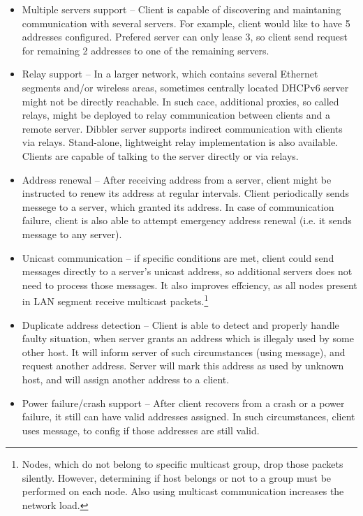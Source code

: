 \begin{itemize}
\item Multiple servers support -- Client is capable of discovering and
  maintaning communication with several servers. For example, client
  would like to have 5 addresses configured. Prefered server can only
  lease 3, so client send request for remaining 2 addresses to one of
  the remaining servers.
\item Relay support -- In a larger network, which contains several
  Ethernet segments and/or wireless areas, sometimes centrally located
  DHCPv6 server might not be directly reachable. In such cace,
  additional proxies, so called relays, might be deployed to relay
  communication between clients and a remote server. Dibbler server
  supports indirect communication with clients via
  relays. Stand-alone, lightweight relay implementation is also
  available. Clients are capable of talking to the server directly or
  via relays.
\item Address renewal -- After receiving address from a server, client
  might be instructed to renew its address at regular
  intervals. Client periodically sends  messege to a
  server, which granted its address. In case of communication failure,
  client is also able to attempt emergency address renewal (i.e. it
  sends  message to any server).
\item Unicast communication -- if specific conditions are met, client
  could send messages directly to a server's unicast address, so
  additional servers does not need to process those messages. It also
  improves effciency, as all nodes present in LAN segment receive
  multicast packets.\footnote{Nodes, which do not belong to specific
    multicast group, drop those packets silently. However, determining
    if host belongs or not to a group must be performed on each
    node. Also using multicast communication increases the network
    load.}
\item Duplicate address detection -- Client is able to detect and
  properly handle faulty situation, when server grants an address
  which is illegaly used by some other host. It will inform server of
  such circumstances (using  message), and request
  another address. Server will mark this address as used by unknown
  host, and will assign another address to a client.
\item Power failure/crash support -- After client recovers from a
  crash or a power failure, it still can have valid addresses
  assigned. In such circumstances, client uses  message,
  to config if those addresses are still valid.

\end{itemize}

